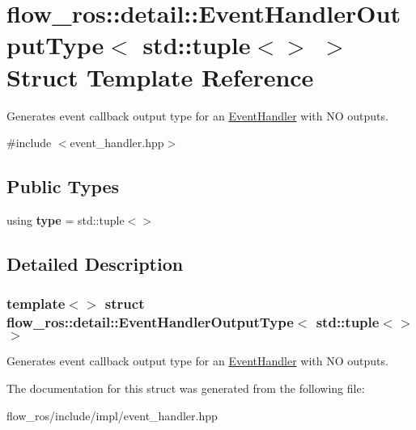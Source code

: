 \hypertarget{structflow__ros_1_1detail_1_1_event_handler_output_type_3_01std_1_1tuple_3_4_01_4}{}\section{flow\+\_\+ros\+:\+:detail\+:\+:Event\+Handler\+Output\+Type$<$ std\+:\+:tuple$<$$>$ $>$ Struct Template Reference}
\label{structflow__ros_1_1detail_1_1_event_handler_output_type_3_01std_1_1tuple_3_4_01_4}


Generates event callback output type for an \hyperlink{classflow__ros_1_1_event_handler}{Event\+Handler} with NO outputs.  




{\ttfamily \#include $<$event\+\_\+handler.\+hpp$>$}

\subsection*{Public Types}
\begin{DoxyCompactItemize}
\item 
\mbox{\label{structflow__ros_1_1detail_1_1_event_handler_output_type_3_01std_1_1tuple_3_4_01_4_a73c49dba0af507dd3d1b00d0cc81c7fb}} 
using {\bfseries type} = std\+::tuple$<$$>$
\end{DoxyCompactItemize}


\subsection{Detailed Description}
\subsubsection*{template$<$$>$\newline
struct flow\+\_\+ros\+::detail\+::\+Event\+Handler\+Output\+Type$<$ std\+::tuple$<$$>$ $>$}

Generates event callback output type for an \hyperlink{classflow__ros_1_1_event_handler}{Event\+Handler} with NO outputs. 

The documentation for this struct was generated from the following file\+:\begin{DoxyCompactItemize}
\item 
flow\+\_\+ros/include/impl/event\+\_\+handler.\+hpp\end{DoxyCompactItemize}
